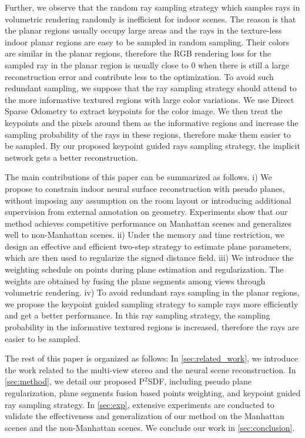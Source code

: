 \documentclass[10pt,journal,compsoc]{IEEEtran}
\begin{document}
	Further, we observe that the random ray sampling strategy which samples rays in volumetric rendering randomly is inefficient for indoor scenes. The reason is that the planar regions usually occupy large areas and the rays in the texture-less indoor planar regions are easy to be sampled in random sampling. Their colors are similar in the planar regions, therefore the RGB rendering loss for the sampled ray in the planar region is usually close to $0$ when there is still a large reconstruction error and contribute less to the optimization. To avoid such redundant sampling, we suppose that the ray sampling strategy should attend to the more informative textured regions with large color variations. We use Direct Sparse Odometry \cite{engel2017direct} to extract keypoints for the color image. We then treat the keypoints and the pixels around them as the informative regions and increase the sampling probability of the rays in these regions, therefore make them easier to be sampled. By our proposed keypoint guided rays sampling strategy, the implicit network gets a better reconstruction.
	
	
	
	The main contributions of this paper can be summarized as follows. i) We propose to constrain indoor neural surface reconstruction with pseudo planes, without imposing any assumption on the room layout or introducing additional supervision from external annotation on geometry. Experiments show that our method achieves competitive performance on Manhattan scenes and generalizes well to non-Manhattan scenes. ii) Under the memory and time restriction, we design an effective and efficient two-step strategy to estimate plane parameters, which are then used to regularize the signed distance field. iii) We introduce the weighting schedule on points during plane estimation and regularization. The weights are obtained by fusing the plane segments among views through volumetric rendering. iv) To avoid redundant rays sampling in the planar regions, we propose the keypoint guided sampling strategy to sample rays more efficiently and get a better performance. In this ray sampling strategy, the sampling probability in the informative textured regions is increased, therefore the rays are easier to be sampled.
	
	The rest of this paper is organized as follows: In \cref{sec:related_work}, we introduce the work related to the multi-view stereo and the neural scene reconstruction. In \cref{sec:method}, we detail our proposed P$^2$SDF, including pseudo plane regularization, plane segments fusion based points weighting, and keypoint guided ray sampling strategy. In \cref{sec:exp}, extensive experiments are conducted to validate the effectiveness and generalization of our method on the Manhattan scenes and the non-Manhattan scenes. We conclude our work in \cref{sec:conclusion}.
	
\end{document}
